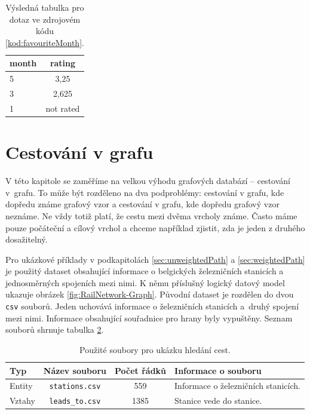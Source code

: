 \documentclass[
  program=infoi,
  biblatex=true,
  figures=true,
  glossaries=false,
  index,
  sourcecodes=true
]{kidiplom}
\begin{document}
\begin{table}[h]
\begin{center}
\caption[Tabulka výsledků pro ukázkový dotaz]{Výsledná tabulka pro dotaz ve zdrojovém kódu \ref{kod:favouriteMonth}.}
\label{tab:favouriteMonth}
\begin{tabular}{ | l | c | }
 \hline
 \textbf{month}  & \textbf{rating} \\
 \hline \hline
 5 & 3,25 \\
 3 & 2,625 \\
 1 & not rated \\
 \hline
\end{tabular}
\end{center}
\end{table}

\clearpage
\section{Cestování v grafu}
V této kapitole se zaměříme na velkou výhodu grafových databází -- cestování v~grafu. To může být rozděleno na dva podproblémy: cestování v grafu, kde dopředu známe grafový vzor a cestování v grafu, kde dopředu grafový vzor neznáme. Ne vždy totiž platí, že cestu mezi dvěma vrcholy známe. Často máme pouze počáteční a cílový vrchol a chceme například zjistit, zda je jeden z druhého dosažitelný.

Pro ukázkové příklady v podkapitolách \ref{sec:unweightedPath} a \ref{sec:weightedPath} je použitý dataset \cite{railNetworkDataset} obsahující informace o belgických železničních stanicích a jednosměrných spojeních mezi nimi. K němu příslušný logický datový model ukazuje obrázek \ref{fig:RailNetwork-Graph}. Původní dataset je rozdělen do dvou \texttt{csv} souborů. Jeden uchovává informace o železničních stanicích a~druhý spojení mezi nimi. Informace obsahující souřadnice pro hrany byly vypuštěny. Seznam souborů shrnuje tabulka \ref{tab:RailNetwork-csv}.

\begin{table}[h]
\caption{Použité soubory pro ukázku hledání cest.}
\label{tab:RailNetwork-csv}
\begin{tabularx}{\textwidth}{ | l | c | c | X | }
 \hline
 \textbf{Typ} & \textbf{Název souboru} & \textbf{Počet řádků} & \textbf{Informace o souboru} \\
 \hline \hline
 Entity & \texttt{stations.csv} & 559 & Informace o železničních stanicích. \\
 \hline
 Vztahy & \texttt{leads\_to.csv} & 1385 & Stanice vede do stanice.\\
 \hline
\end{tabularx}
\end{table}
\end{document}

